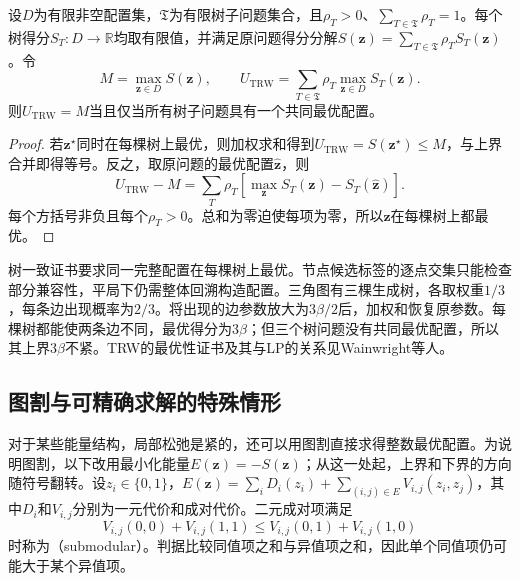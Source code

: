 \begin{lemma}[树一致的最优性证书]
  \label{lem:pgm-variational-tree-agreement}
  设$D$为有限非空配置集，$\mathfrak T$为有限树子问题集合，且$\rho_T>0$、$\sum_{T\in\mathfrak T}\rho_T=1$。每个树得分$S_T:D\to\mathbb R$均取有限值，并满足原问题得分分解$S(\bm z)=\sum_{T\in\mathfrak T}\rho_TS_T(\bm z)$。令
  \[
    M=\max_{\bm z\in D}S(\bm z),
    \qquad
    U_{\mathrm{TRW}}
      =\sum_{T\in\mathfrak T}\rho_T
         \max_{\bm z\in D}S_T(\bm z).
  \]
  则$U_{\mathrm{TRW}}=M$当且仅当所有树子问题具有一个共同最优配置。
\end{lemma}
\begin{proof}
  若$\bm z^\star$同时在每棵树上最优，则加权求和得到$U_{\mathrm{TRW}}=S(\bm z^\star)\leq M$，与上界合并即得等号。反之，取原问题的最优配置$\widehat{\bm z}$，则
  \[
    U_{\mathrm{TRW}}-M
      =\sum_T\rho_T
         \left[\max_{\bm z}S_T(\bm z)-S_T(\widehat{\bm z})\right].
  \]
  每个方括号非负且每个$\rho_T>0$。总和为零迫使每项为零，所以$\widehat{\bm z}$在每棵树上都最优。
\end{proof}

树一致证书要求同一完整配置在每棵树上最优。节点候选标签的逐点交集只能检查部分兼容性，平局下仍需整体回溯构造配置。三角图有三棵生成树，各取权重$1/3$，每条边出现概率为$2/3$。将出现的边参数放大为$3\beta/2$后，加权和恢复原参数。每棵树都能使两条边不同，最优得分为$3\beta$；但三个树问题没有共同最优配置，所以其上界$3\beta$不紧。TRW的最优性证书及其与LP的关系见Wainwright等人。

\subsection{图割与可精确求解的特殊情形}
\label{sec:pgm-variational-graph-cut-special}
\label{sec:pgm-variational-graph-cuts}

对于某些能量结构，局部松弛是紧的，还可以用图割直接求得整数最优配置。为说明图割，以下改用最小化能量$E(\bm z)=-S(\bm z)$；从这一处起，上界和下界的方向随符号翻转。设$z_i\in\{0,1\}$，$E(\bm z)=\sum_iD_i(z_i)+\sum_{(i,j)\in E}V_{i,j}(z_i,z_j)$，其中$D_i$和$V_{i,j}$分别为一元代价和成对代价。二元成对项满足
\begin{equation}
  V_{i,j}(0,0)+V_{i,j}(1,1)
    \leq V_{i,j}(0,1)+V_{i,j}(1,0)
  \label{eq:pgm-variational-submodular}
\end{equation}
时称为（submodular）。判据比较同值项之和与异值项之和，因此单个同值项仍可能大于某个异值项。

